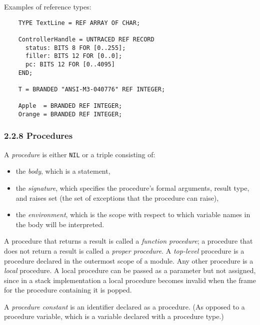 \documentclass[10pt]{article}
\begin{document}
Examples of reference types:
\begin{verbatim}
    TYPE TextLine = REF ARRAY OF CHAR;

    ControllerHandle = UNTRACED REF RECORD
      status: BITS 8 FOR [0..255];
      filler: BITS 12 FOR [0..0];
      pc: BITS 12 FOR [0..4095]
    END;

    T = BRANDED "ANSI-M3-040776" REF INTEGER;

    Apple  = BRANDED REF INTEGER;
    Orange = BRANDED REF INTEGER;
\end{verbatim}

\subsubsection*{2.2.8 Procedures}

A \emph{procedure} is either \verb|NIL| or a triple consisting of:
\begin{itemize}
\item the \emph{body}, which is a statement,
\item the \emph{signature}, which specifies the procedure's formal arguments,
  result type, and raises set (the set of exceptions that the procedure can
  raise),
\item the \emph{environment}, which is the scope with respect to which
  variable names in the body will be interpreted.
\end{itemize}

A procedure that returns a result is called a \emph{function procedure}; a
procedure that does not return a result is called a \emph{proper procedure}.
A \emph{top-level} procedure is a procedure declared in the outermost scope of
a module.  Any other procedure is a \emph{local} procedure.  A local procedure
can be passed as a parameter but not assigned, since in a stack implementation
a local procedure becomes invalid when the frame for the procedure containing
it is popped.

A \emph{procedure constant} is an identifier declared as a procedure.  (As
opposed to a procedure variable, which is a variable declared with a procedure
type.)
\end{document}
